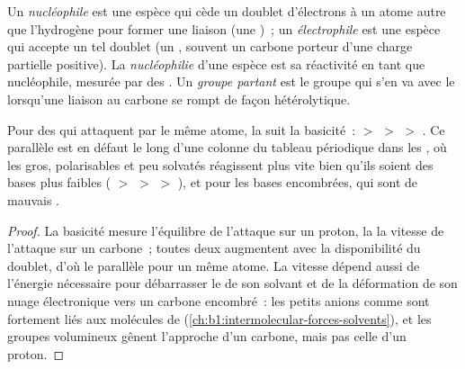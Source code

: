 \begin{definition}\label{def:b1:electronic-effects:nucleophile}
Un \emph{nucléophile} est une espèce qui cède un doublet
d'électrons à un atome autre que l'hydrogène pour former une liaison
(une )~; un \emph{électrophile} est une espèce qui
accepte un tel doublet (un , souvent un carbone porteur
d'une charge partielle positive). La \emph{nucléophilie} d'une
espèce est sa réactivité en tant que nucléophile, mesurée par des
. Un \emph{groupe partant} est
le groupe qui s'en va avec le  lorsqu'une liaison au
carbone se rompt de façon hétérolytique.
\end{definition}

\begin{proposition}\label{prop:b1:electronic-effects:nucleophilicity-basicity}
Pour des  qui attaquent par le même atome, la 
suit la basicité~:  $>$  $>$  $>$
. Ce parallèle est en défaut le long d'une colonne du tableau
périodique dans les , où les  gros,
polarisables et peu solvatés réagissent plus vite bien qu'ils soient des
bases plus faibles ( $>$  $>$  $>$ ), et
pour les bases encombrées, qui sont de mauvais .
\end{proposition}

\begin{proof}
La basicité mesure l'équilibre de l'attaque sur un proton, la
 la vitesse de l'attaque sur un carbone~; toutes deux
augmentent avec la disponibilité du doublet, d'où le parallèle pour un
même atome. La vitesse dépend aussi de l'énergie nécessaire pour
débarrasser le  de son solvant et de la déformation de son
nuage électronique vers un carbone encombré~: les petits anions comme
 sont fortement liés aux molécules de 
(\cref{ch:b1:intermolecular-forces-solvents}), et les groupes
volumineux gênent l'approche d'un carbone, mais pas celle d'un proton.
\end{proof}

